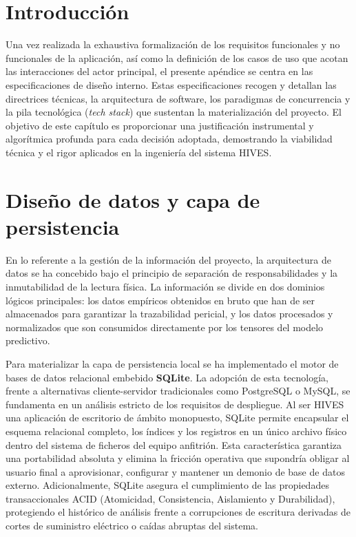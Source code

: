 
\section{Introducción}
Una vez realizada la exhaustiva formalización de los requisitos funcionales y no funcionales de la aplicación, así como la definición de los casos de uso que acotan las interacciones del actor principal, el presente apéndice se centra en las especificaciones de diseño interno. Estas especificaciones recogen y detallan las directrices técnicas, la arquitectura de software, los paradigmas de concurrencia y la pila tecnológica (\textit{tech stack}) que sustentan la materialización del proyecto. El objetivo de este capítulo es proporcionar una justificación instrumental y algorítmica profunda para cada decisión adoptada, demostrando la viabilidad técnica y el rigor aplicados en la ingeniería del sistema HIVES.

\section{Diseño de datos y capa de persistencia}

En lo referente a la gestión de la información del proyecto, la arquitectura de datos se ha concebido bajo el principio de separación de responsabilidades y la inmutabilidad de la lectura física. La información se divide en dos dominios lógicos principales: los datos empíricos obtenidos en bruto que han de ser almacenados para garantizar la trazabilidad pericial, y los datos procesados y normalizados que son consumidos directamente por los tensores del modelo predictivo.

Para materializar la capa de persistencia local se ha implementado el motor de bases de datos relacional embebido \textbf{SQLite}. La adopción de esta tecnología, frente a alternativas cliente-servidor tradicionales como PostgreSQL o MySQL, se fundamenta en un análisis estricto de los requisitos de despliegue. Al ser HIVES una aplicación de escritorio de ámbito monopuesto, SQLite \cite{sqlite2024whentouse} permite encapsular el esquema relacional completo, los índices y los registros en un único archivo físico dentro del sistema de ficheros del equipo anfitrión. Esta característica garantiza una portabilidad absoluta y elimina la fricción operativa que supondría obligar al usuario final a aprovisionar, configurar y mantener un demonio de base de datos externo. Adicionalmente, SQLite asegura el cumplimiento de las propiedades transaccionales ACID (Atomicidad, Consistencia, Aislamiento y Durabilidad)\cite{sqlite2024acid}, protegiendo el histórico de análisis frente a corrupciones de escritura derivadas de cortes de suministro eléctrico o caídas abruptas del sistema.

